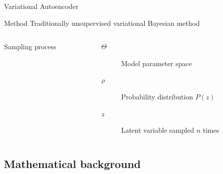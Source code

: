 \documentclass{beamer}
\begin{document}
\begin{frame}{Variational Autoencoder}
    \begin{block}{Method}
        Traditionally unsupervised variational Bayesian method
    \end{block}
    \begin{columns}
        \begin{column}{0.30\textwidth}
            \begin{block}{Sampling process}
                \begin{center}
                \end{center}
            \end{block}
        \end{column}
        \begin{column}{0.65\textwidth}
            \begin{block}{}
                \begin{description}
                    \item[$\Theta$] Model parameter space
                    \item[$\rho$] Probability distribution $P(z)$
                    \item[$z$] Latent variable sampled $n$ times
                \end{description}
            \end{block}
        \end{column}
    \end{columns}
\end{frame}

\subsection{Mathematical background}
\end{document}
